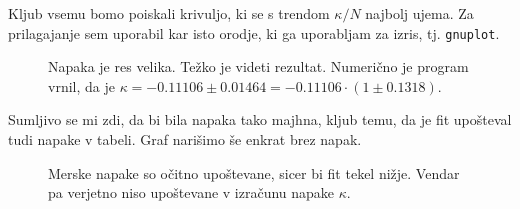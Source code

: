 \documentclass[a4 paper, 12pt]{article}
\begin{document}
Kljub vsemu bomo poiskali krivuljo, ki se s trendom $\kappa/N$ najbolj ujema. Za prilagajanje sem uporabil kar isto orodje,
ki ga uporabljam za izris, tj. {\tt gnuplot}.

\begin{figure}[H]
	
	\caption{Napaka je res velika. Težko je videti rezultat. Numerično je program vrnil, da je $\kappa = -0.11106 \pm 0.01464 =
		-0.11106 \cdot (1 \pm 0.1318)$.}
\end{figure}

Sumljivo se mi zdi, da bi bila napaka tako majhna, kljub temu, da je fit upošteval tudi napake v tabeli. Graf narišimo še enkrat brez
napak.

\begin{figure}[H]
	
	\caption{Merske napake so očitno upoštevane, sicer bi fit tekel nižje. Vendar pa verjetno niso upoštevane v
		izračunu napake $\kappa$.}
\end{figure}
\end{document}
